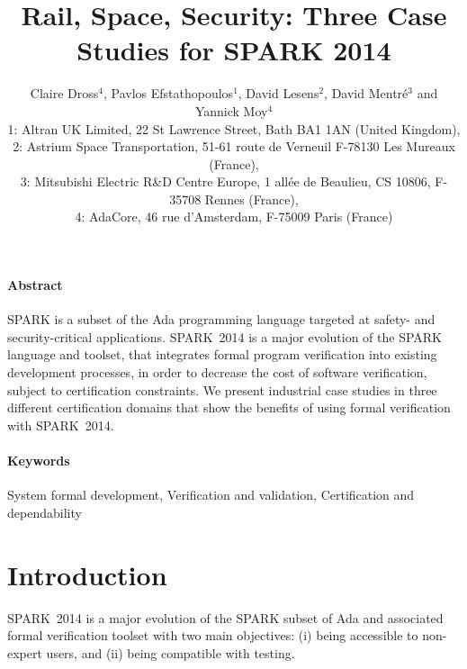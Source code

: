\documentclass[10pt,a4paper,twocolumn]{article}
\newcommand{\newspark}{SPARK~2014\xspace}
\begin{document}
\title{Rail, Space, Security: Three Case Studies for SPARK 2014}

\author{%
\large Claire Dross$^4$, Pavlos Efstathopoulos$^1$, David Lesens$^2$, David Mentré$^3$ and Yannick Moy$^4$\\
\normalsize 1: Altran UK Limited, 22 St Lawrence Street, Bath BA1 1AN (United Kingdom),\\
\normalsize 2: Astrium Space Transportation, 51-61 route de Verneuil F-78130 Les Mureaux (France),\\
\normalsize 3: Mitsubishi Electric R\&D Centre Europe, 1 allée de
Beaulieu, CS 10806, F-35708 Rennes (France),\\
\normalsize 4: AdaCore, 46 rue d'Amsterdam, F-75009 Paris (France)}

\date{}

\maketitle

\paragraph{Abstract}
SPARK is a subset of the Ada programming language targeted at safety-
and security-critical applications. \newspark is a major evolution of
the SPARK language and toolset, that integrates formal program
verification into existing development processes, in order to decrease
the cost of software verification, subject to certification
constraints. We present industrial case studies in three different
certification domains that show the benefits of using formal
verification with \newspark.

\paragraph{Keywords}
System formal development, Verification and validation,
Certification and dependability

\section{Introduction}

\newspark is a major evolution of the SPARK subset of Ada and
associated formal verification toolset with two main objectives: (i)
being accessible to non-expert users, and (ii) being compatible with
testing.
\end{document}
